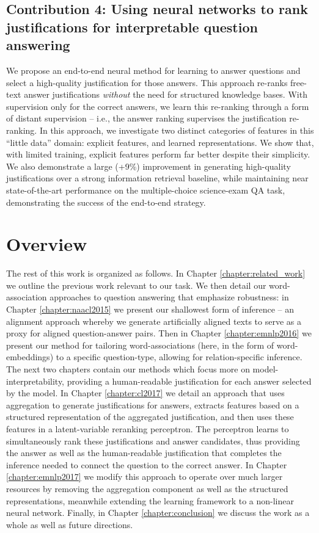 \subsection{Contribution 4: Using neural networks to rank justifications for interpretable question answering} We propose an end-to-end neural method for learning to answer questions and select a high-quality justification for those answers. 
This approach re-ranks free-text answer justifications \emph{without} the need for structured knowledge bases. 
With supervision only for the correct answers, we learn this re-ranking through a form of distant supervision -- i.e., the answer ranking supervises the justification re-ranking. In this approach, we investigate two distinct categories of features in this ``little data'' domain: explicit features, and learned representations. We show that, with limited training, explicit features perform far better despite their simplicity.  We also demonstrate a large (+9\%) improvement in generating high-quality justifications over a strong information retrieval baseline, while maintaining near state-of-the-art performance on the multiple-choice science-exam QA task, demonstrating the success of the end-to-end strategy.




\section{Overview\label{sec:overview}}
  
The rest of this work is organized as follows.  In Chapter \ref{chapter:related_work} we outline the previous work relevant to our task.
We then detail our word-association approaches to question answering that emphasize robustness: in Chapter \ref{chapter:naacl2015} we present our shallowest form of inference -- an alignment approach whereby we generate artificially aligned texts to serve as a proxy for aligned question-answer pairs.  Then in Chapter \ref{chapter:emnlp2016} we present our method for tailoring word-associations (here, in the form of word-embeddings) to a specific question-type, allowing for relation-specific inference.  The next two chapters contain our methods which focus more on model-interpretability, providing a human-readable justification for each answer selected by the model.  In Chapter \ref{chapter:cl2017} we detail an approach that uses aggregation to generate justifications for answers, extracts features based on a structured representation of the aggregated justification, and then uses these features in a latent-variable reranking perceptron.  The perceptron learns to simultaneously rank these justifications and answer candidates, thus providing the answer as well as the human-readable justification that completes the inference needed to connect the question to the correct answer.  In Chapter \ref{chapter:emnlp2017} we modify this approach to operate over much larger resources by removing the aggregation component as well as the structured representations, meanwhile extending the learning framework to a non-linear neural network.  Finally, in Chapter \ref{chapter:conclusion} we discuss the work as a whole as well as future directions.
